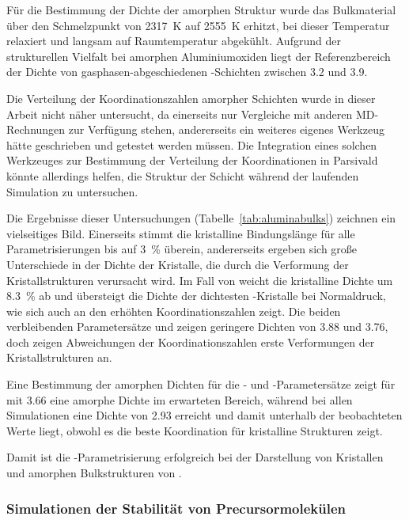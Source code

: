Für die Bestimmung der Dichte der amorphen Struktur wurde das Bulkmaterial über den Schmelzpunkt von \SI{2317}{\kelvin} auf \SI{2555}{\kelvin} erhitzt, bei dieser Temperatur relaxiert und langsam auf Raumtemperatur abgekühlt.
Aufgrund der strukturellen Vielfalt bei amorphen Aluminiumoxiden liegt der Referenzbereich der Dichte von gasphasen-abgeschiedenen -Schichten zwischen \SI{3.2}{\gpcc} und \SI{3.9}{\gpcc}\cite{wang_dependence_1997}.

Die Verteilung der Koordinationszahlen amorpher Schichten wurde in dieser Arbeit nicht näher untersucht, da einerseits nur Vergleiche mit anderen MD-Rechnungen zur Verfügung stehen\cite{gutierrez_molecular_2002}, andererseits ein weiteres eigenes Werkzeug hätte geschrieben und getestet werden müssen.
Die Integration eines solchen Werkzeuges zur Bestimmung der Verteilung der Koordinationen in Parsivald könnte allerdings helfen, die Struktur der Schicht während der laufenden Simulation zu untersuchen.

Die Ergebnisse dieser Untersuchungen (Tabelle~\ref{tab:aluminabulks}) zeichnen ein vielseitiges Bild.
Einerseits stimmt die kristalline Bindungslänge für alle Parametrisierungen bis auf \SI{3}{\percent} überein, andererseits ergeben sich große Unterschiede in der Dichte der Kristalle, die durch die Verformung der Kristallstrukturen verursacht wird.
Im Fall von  weicht die kristalline Dichte um \SI{+8.3}{\percent} ab und übersteigt die Dichte der dichtesten -Kristalle bei Normaldruck, wie sich auch an den erhöhten Koordinationszahlen zeigt.
Die beiden verbleibenden Parametersätze  und  zeigen geringere Dichten von \SI{3.88}{\gpcc} und \SI{3.76}{\gpcc}, doch zeigen Abweichungen der Koordinationszahlen erste Verformungen der Kristallstrukturen an.

Eine Bestimmung der amorphen Dichten für die - und -Parametersätze zeigt für  mit \SI{3.66}{\gpcc} eine amorphe Dichte im erwarteten Bereich, während  bei allen Simulationen eine Dichte von \SI{2.93}{\gpcc} erreicht und damit unterhalb der beobachteten Werte liegt, obwohl es die beste Koordination für kristalline Strukturen zeigt.

Damit ist die -Parametrisierung erfolgreich bei der Darstellung von Kristallen und amorphen Bulkstrukturen von .

\subsubsection{Simulationen der Stabilität von Precursormolekülen}

